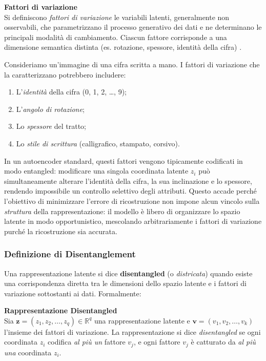 \begin{notebox}
\textbf{Fattori di variazione}\\
Si definiscono \textit{fattori di variazione} le variabili latenti, generalmente non osservabili, che parametrizzano il processo generativo dei dati e ne determinano le principali modalità di cambiamento. Ciascun fattore corrisponde a una dimensione semantica distinta (es. rotazione, spessore, identità della cifra) \parencite{wang2024disentangledrepresentationlearning}.
\end{notebox}

Consideriamo un'immagine di una cifra scritta a mano. I fattori di variazione che la caratterizzano potrebbero includere:
\begin{enumerate}[label=\roman*.]
    \item L'\textit{identità} della cifra (0, 1, 2, \dots, 9);
    \item L'\textit{angolo di rotazione};
    \item Lo \textit{spessore} del tratto;
    \item Lo \textit{stile di scrittura} (calligrafico, stampato, corsivo).
\end{enumerate}

In un autoencoder standard, questi fattori vengono tipicamente codificati in modo entangled: modificare una singola coordinata latente $z_i$ può simultaneamente alterare l'identità della cifra, la sua inclinazione e lo spessore, rendendo impossibile un controllo selettivo degli attributi.
Questo accade perché l'obiettivo di minimizzare l'errore di ricostruzione non impone alcun vincolo sulla \textit{struttura} della rappresentazione: il modello è libero di organizzare lo spazio latente in modo opportunistico, mescolando arbitrariamente i fattori di variazione purché la ricostruzione sia accurata.

\subsubsection{Definizione di Disentanglement}

Una rappresentazione latente si dice \textbf{disentangled} (o \textit{districata}) quando esiste una corrispondenza diretta tra le dimensioni dello spazio latente e i fattori di variazione sottostanti ai dati. Formalmente:

\begin{notebox}
\textbf{Rappresentazione Disentangled}\\
Sia $\mathbf{z} = (z_1, z_2, \dots, z_q) \in \mathbb{R}^q$ una rappresentazione latente e $\mathbf{v} = (v_1, v_2, \dots, v_k)$ l'insieme dei fattori di variazione. La rappresentazione si dice \textit{disentangled} se ogni coordinata $z_i$ codifica \textit{al più un} fattore $v_j$, e ogni fattore $v_j$ è catturato da \textit{al più una} coordinata $z_i$.
\end{notebox}

